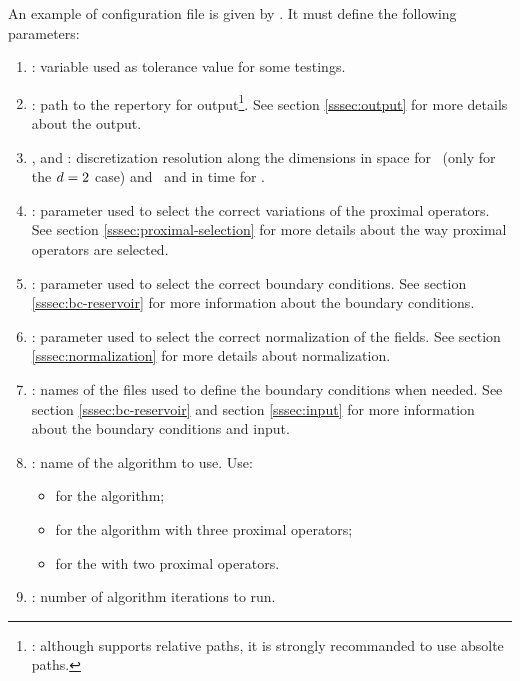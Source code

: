         An example of configuration file is given by . It must define the following
        parameters:
        \begin{enumerate}
            \item {}: variable used as tolerance value for some testings.
            \item {}: path to the repertory for 
                output\footnote{\NB{}: although \python{} supports relative paths, it is strongly recommanded to use absolte paths.}. See 
                section \ref{sssec:output} for more details about the output.
            \item {},  and : discretization resolution along the dimensions in space for 
                 (only for the $d{}=2$ case) and  and in time for .
            \item {}: parameter used to select the correct variations of the proximal operators. 
                See section \ref{sssec:proximal-selection} for more details about the way proximal operators are selected.
            \item {}: parameter used to select the correct boundary conditions. See section \ref{sssec:bc-reservoir} for 
                more information about the boundary conditions.
            \item {}: parameter used to select the correct normalization of the fields. See section \ref{sssec:normalization}
                for more details about normalization.
            \item {}: names of the files used to define the boundary conditions when needed. See section \ref{sssec:bc-reservoir} and
                section \ref{sssec:input} for more information about the boundary conditions and input.
            \item {}: name of the algorithm to use. Use:
                \begin{itemize}
                    \item {} for the \pdAlgo{} algorithm;
                    \item {} for the \drAlgo{} algorithm with three proximal operators;
                    \item {} for the \drAlgo{} with two proximal operators. 
                \end{itemize}
            \item {}: number of algorithm iterations to run.

\end{enumerate}
